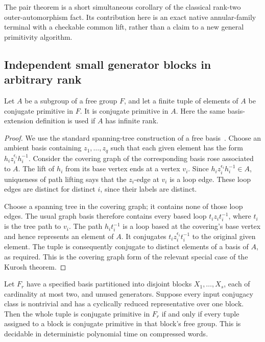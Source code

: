 The pair theorem is a short simultaneous corollary of
the classical rank-two outer-automorphism fact.  Its contribution here is an
exact native annular-family terminal with a checkable common lift, rather
than a claim to a new general primitivity algorithm.

\subsection{Independent small generator blocks in arbitrary rank}

\begin{lemma}
\label{lem:heredity}
Let $A$ be a subgroup of a free group $F$, and let a finite tuple of elements
of $A$ be conjugate primitive in $F$.  It is conjugate primitive in $A$.
Here the same basis-extension definition is used if $A$ has infinite rank.
\end{lemma}

\begin{proof}
We use the standard spanning-tree construction of a free basis~\cite{kapovichmyasnikov2002}.
Choose an ambient basis containing $z_1,\ldots,z_q$ such that each given
element has the form $h_i z_i^{\epsilon_i}h_i^{-1}$.  Consider the covering
graph of the corresponding basis rose associated to $A$.  The lift of
$h_i$ from its base vertex ends at a vertex $v_i$.  Since
$h_i z_i^{\epsilon_i}h_i^{-1}\in A$, uniqueness of path lifting says
that the $z_i$-edge at $v_i$ is a loop edge.  These loop edges are distinct
for distinct $i$, since their labels are distinct.

Choose a spanning tree in the covering graph; it contains none of those
loop edges.  The usual graph basis therefore contains every based loop
$t_i z_i t_i^{-1}$, where $t_i$ is the tree path to $v_i$.  The path
$h_i t_i^{-1}$ is a loop based at the covering's base vertex and hence
represents an element of $A$.  It conjugates $t_i z_i^{\epsilon_i}t_i^{-1}$
to the original given element.  The tuple is consequently conjugate to
distinct elements of a basis of $A$, as required.  This is the covering
graph form of the relevant special case of the Kurosh theorem.
\end{proof}

\begin{theorem}
\label{thm:blocks}
Let $F_r$ have a specified basis partitioned into disjoint blocks
$X_1,\ldots,X_s$, each of cardinality at most two, and unused generators.
Suppose every input conjugacy class is nontrivial and has a cyclically reduced
representative over one block.  Then the whole tuple is conjugate primitive
in $F_r$ if and only if every tuple assigned to a block is conjugate
primitive in that block's free group.  This is decidable in deterministic
polynomial time on compressed words.
\end{theorem}

